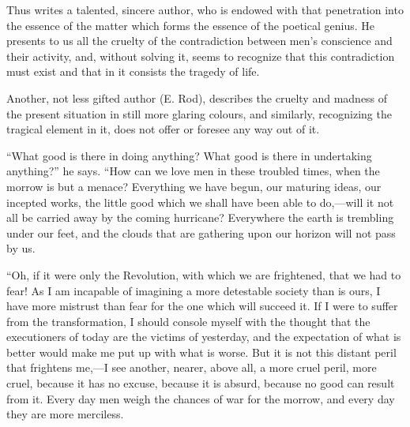 \documentclass{book}
\begin{document}
Thus writes a talented, sincere author, who is endowed with that penetration into the essence of the matter which forms the essence of the poetical genius. He presents to us all the cruelty of the contradiction between men’s conscience and their activity, and, without solving it, seems to recognize that this contradiction must exist and that in it consists the tragedy of life.

Another, not less gifted author (E. Rod), describes the cruelty and madness of the present situation in still more glaring colours, and similarly, recognizing the tragical element in it, does not offer or foresee any way out of it.

“What good is there in doing anything? What good is there in undertaking anything?” he says. “How can we love men in these troubled times, when the morrow is but a menace? Everything we have begun, our maturing ideas, our incepted works, the little good which we shall have been able to do,—will it not all be carried away by the coming hurricane? Everywhere the earth is trembling under our feet, and the clouds that are gathering upon our horizon will not pass by us.

“Oh, if it were only the Revolution, with which we are frightened, that we had to fear! As I am incapable of imagining a more detestable society than is ours, I have more mistrust than fear for the one which will succeed it. If I were to suffer from the transformation, I should console myself with the thought that the executioners of today are the victims of yesterday, and the expectation of what is better would make me put up with what is worse. But it is not this distant peril that frightens me,—I see another, nearer, above all, a more cruel peril, more cruel, because it has no excuse, because it is absurd, because no good can result from it. Every day men weigh the chances of war for the morrow, and every day they are more merciless.
\end{document}
